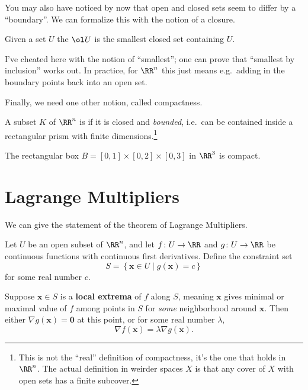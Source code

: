 \documentclass[11pt]{scrartcl}
\begin{document}
You may also have noticed by now that open and closed sets seem to differ
by a ``boundary''. We can formalize this with the notion of a closure.
\begin{definition}
  Given a set $U$ the  $\ol U$ is the smallest closed set containing $U$.
\end{definition}
I've cheated here with the notion of ``smallest'';
one can prove that ``smallest by inclusion'' works out.
In practice, for $\RR^n$ this just means {e.g.}\
adding in the boundary points back into an open set.


Finally, we need one other notion, called compactness.
\begin{definition}
  A subset $K$ of $\RR^n$ is 
  if it is closed and \emph{bounded},
  i.e.\ can be contained inside a rectangular prism
  with finite dimensions.\footnote{This
    is not the ``real'' definition of compactness,
    it's the one that holds in $\RR^n$.
    The actual definition in weirder spaces $X$ is that
    any cover of $X$ with open sets has a finite subcover.}
\end{definition}

\begin{example}
  The rectangular box
  $B = [0,1] \times [0,2] \times [0,3]$ in $\RR^3$
  is compact.
\end{example}

\section{Lagrange Multipliers}
We can give the statement of the theorem of Lagrange Multipliers.

\begin{theorem}
  Let $U$ be an open subset of $\RR^n$, and let $f \colon U \to \RR$
  and $g \colon U \to \RR$ be continuous functions with continuous first derivatives.
  Define the constraint set
  \[ S = \left\{ \mathbf{x} \in U \mid g(\mathbf{x}) = c \right\} \]
  for some real number $c$.

  Suppose $\mathbf{x} \in S$ is a \textbf{local extrema} of $f$ along $S$,
  meaning $\mathbf{x}$ gives minimal or maximal value
  of $f$ among points in $S$ for \emph{some} neighborhood around $\mathbf{x}$.
  Then either $\nabla g(\mathbf{x}) = \mathbf{0}$ at this point,
  or for some real number $\lambda$,
  \[ \nabla f(\mathbf{x}) = \lambda \nabla g(\mathbf{x}). \]
\end{theorem}
\end{document}
